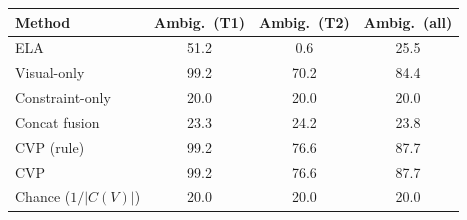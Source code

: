 \begin{tabular}{lccc}
\toprule
Method & Ambig.\ (T1) & Ambig.\ (T2) & Ambig.\ (all)\\
\midrule
ELA & 51.2 & 0.6 & 25.5\\
Visual-only & 99.2 & 70.2 & 84.4\\
Constraint-only & 20.0 & 20.0 & 20.0\\
Concat fusion & 23.3 & 24.2 & 23.8\\
CVP (rule) & 99.2 & 76.6 & 87.7\\
CVP & 99.2 & 76.6 & 87.7\\
\midrule
Chance ($1/|C(V)|$) & 20.0 & 20.0 & 20.0\\
\bottomrule
\end{tabular}
